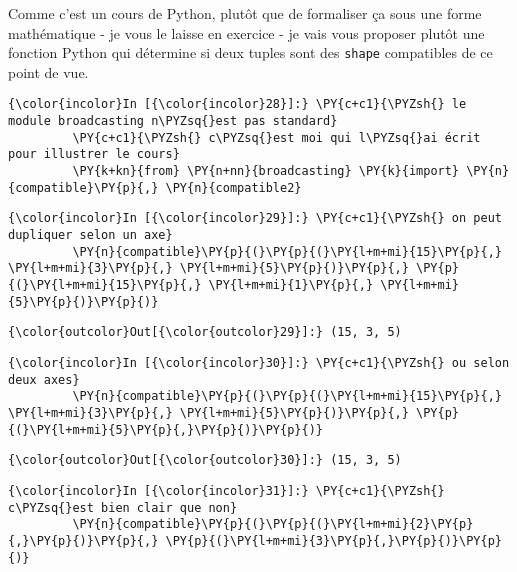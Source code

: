     Comme c'est un cours de Python, plutôt que de formaliser ça sous une
forme mathématique - je vous le laisse en exercice - je vais vous
proposer plutôt une fonction Python qui détermine si deux tuples sont
des \texttt{shape} compatibles de ce point de vue.

    \begin{Verbatim}[commandchars=\\\{\}]
{\color{incolor}In [{\color{incolor}28}]:} \PY{c+c1}{\PYZsh{} le module broadcasting n\PYZsq{}est pas standard}
         \PY{c+c1}{\PYZsh{} c\PYZsq{}est moi qui l\PYZsq{}ai écrit pour illustrer le cours}
         \PY{k+kn}{from} \PY{n+nn}{broadcasting} \PY{k}{import} \PY{n}{compatible}\PY{p}{,} \PY{n}{compatible2}
\end{Verbatim}


    \begin{Verbatim}[commandchars=\\\{\}]
{\color{incolor}In [{\color{incolor}29}]:} \PY{c+c1}{\PYZsh{} on peut dupliquer selon un axe}
         \PY{n}{compatible}\PY{p}{(}\PY{p}{(}\PY{l+m+mi}{15}\PY{p}{,} \PY{l+m+mi}{3}\PY{p}{,} \PY{l+m+mi}{5}\PY{p}{)}\PY{p}{,} \PY{p}{(}\PY{l+m+mi}{15}\PY{p}{,} \PY{l+m+mi}{1}\PY{p}{,} \PY{l+m+mi}{5}\PY{p}{)}\PY{p}{)}
\end{Verbatim}


\begin{Verbatim}[commandchars=\\\{\}]
{\color{outcolor}Out[{\color{outcolor}29}]:} (15, 3, 5)
\end{Verbatim}
            
    \begin{Verbatim}[commandchars=\\\{\}]
{\color{incolor}In [{\color{incolor}30}]:} \PY{c+c1}{\PYZsh{} ou selon deux axes}
         \PY{n}{compatible}\PY{p}{(}\PY{p}{(}\PY{l+m+mi}{15}\PY{p}{,} \PY{l+m+mi}{3}\PY{p}{,} \PY{l+m+mi}{5}\PY{p}{)}\PY{p}{,} \PY{p}{(}\PY{l+m+mi}{5}\PY{p}{,}\PY{p}{)}\PY{p}{)}
\end{Verbatim}


\begin{Verbatim}[commandchars=\\\{\}]
{\color{outcolor}Out[{\color{outcolor}30}]:} (15, 3, 5)
\end{Verbatim}
            
    \begin{Verbatim}[commandchars=\\\{\}]
{\color{incolor}In [{\color{incolor}31}]:} \PY{c+c1}{\PYZsh{} c\PYZsq{}est bien clair que non}
         \PY{n}{compatible}\PY{p}{(}\PY{p}{(}\PY{l+m+mi}{2}\PY{p}{,}\PY{p}{)}\PY{p}{,} \PY{p}{(}\PY{l+m+mi}{3}\PY{p}{,}\PY{p}{)}\PY{p}{)}
\end{Verbatim}


